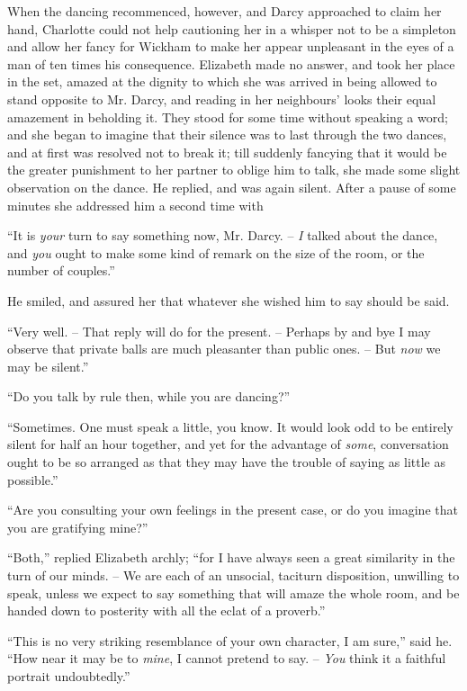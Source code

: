When the dancing recommenced, however, and Darcy
approached to claim her hand, Charlotte could not help
cautioning her in a whisper not to be a simpleton and
allow her fancy for Wickham to make her appear unpleasant
in the eyes of a man of ten times his consequence.
Elizabeth made no answer, and took her place in the set,
amazed at the dignity to which she was arrived in being
allowed to stand opposite to Mr. Darcy, and reading in her
neighbours’ looks their equal amazement in beholding it.
They stood for some time without speaking a word; and
she began to imagine that their silence was to last through
the two dances, and at first was resolved not to break it;
till suddenly fancying that it would be the greater punishment
to her partner to oblige him to talk, she made some
slight observation on the dance. He replied, and was
again silent. After a pause of some minutes she addressed
him a second time with

“It is \textit{your} turn to say something now, Mr. Darcy. -- \textit{I}
talked about the dance, and \textit{you} ought to make some
kind of remark on the size of the room, or the number
of couples.”

He smiled, and assured her that whatever she wished
him to say should be said.

“Very well. -- That reply will do for the present. -- Perhaps
by and bye I may observe that private balls are
much pleasanter than public ones. -- But \textit{now} we may be
silent.”

“Do you talk by rule then, while you are dancing?”

“Sometimes. One must speak a little, you know. It
would look odd to be entirely silent for half an hour
together, and yet for the advantage of \textit{some}, conversation
ought to be so arranged as that they may have the trouble
of saying as little as possible.”

“Are you consulting your own feelings in the present
case, or do you imagine that you are gratifying mine?”

“Both,” replied Elizabeth archly; “for I have always
seen a great similarity in the turn of our minds. -- We are
each of an unsocial, taciturn disposition, unwilling to
speak, unless we expect to say something that will amaze
the whole room, and be handed down to posterity with
all the eclat of a proverb.”

“This is no very striking resemblance of your own
character, I am sure,” said he. “How near it may be
to \textit{mine}, I cannot pretend to say. -- \textit{You} think it a faithful
portrait undoubtedly.”

